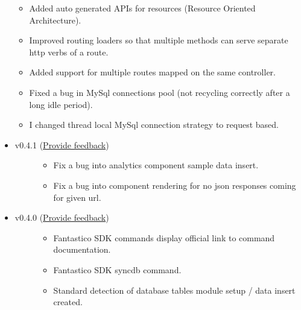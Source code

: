 \documentclass[letterpaper,10pt,english]{sphinxmanual}
\begin{document}
\begin{itemize}
\begin{itemize}
\item {} 
Added auto generated APIs for resources (Resource Oriented Architecture).

\item {} 
Improved routing loaders so that multiple methods can serve separate http verbs of a route.

\item {} 
Added support for multiple routes mapped on the same controller.

\item {} 
Fixed a bug in MySql connections pool (not recycling correctly after a long idle period).

\item {} 
I changed thread local MySql connection strategy to request based.

\end{itemize}

\item {} \begin{description}
\item[{v0.4.1 (\href{https://docs.google.com/forms/d/1tKBopU3lfDB\_w8F4h7Rl1Rn4uydAJq-nha09L\_ptJck/edit?usp=sharing}{Provide feedback})}] \leavevmode\begin{itemize}
\item {} 
Fix a bug into analytics component sample data insert.

\item {} 
Fix a bug into component rendering for no json responses coming for given url.

\end{itemize}

\end{description}

\item {} \begin{description}
\item[{v0.4.0 (\href{https://docs.google.com/forms/d/1tKBopU3lfDB\_w8F4h7Rl1Rn4uydAJq-nha09L\_ptJck/edit?usp=sharing}{Provide feedback})}] \leavevmode\begin{itemize}
\item {} 
Fantastico SDK commands display official link to command documentation.

\item {} 
Fantastico SDK syncdb command.

\item {} 
Standard detection of database tables module setup / data insert created.


\end{itemize}
\end{description}
\end{itemize}
\end{document}
